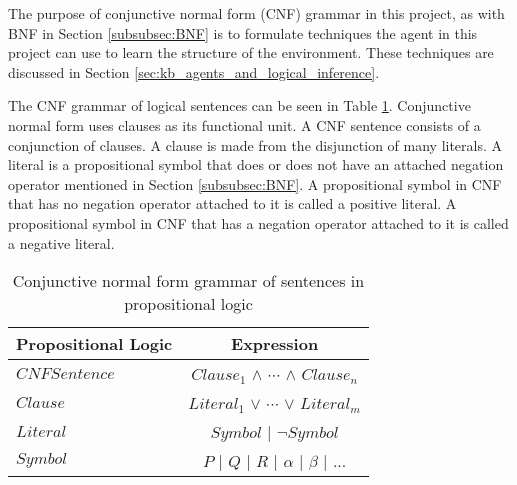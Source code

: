 The purpose of conjunctive normal form (CNF) grammar in this project, as with BNF in Section \ref{subsubsec:BNF} is to formulate techniques the agent in this project can use to learn the structure of the environment. These techniques are  discussed in Section \ref{sec:kb_agents_and_logical_inference}.

The CNF grammar of logical sentences can be seen in Table \ref{table:CNF_Syntax}. Conjunctive normal form uses clauses as its functional unit. A CNF sentence consists of a conjunction of clauses. A clause is made from the disjunction of many literals. A literal is a propositional symbol that does or does not have an attached negation operator mentioned in Section \ref{subsubsec:BNF}. A propositional symbol in CNF that has no negation operator attached to it is called a positive literal. A propositional symbol in CNF that has a negation operator attached to it is called a negative literal.


\begin{table}[H]
  \centering
  \begin{tabular}{lc}
    \toprule
    \textbf{Propositional Logic}  \hspace{1cm}   & \textbf{Expression}  \\
    \toprule
    $CNFSentence$ & $Clause_1$ $\wedge$ $\cdots$  $\wedge$ $Clause_n$ \\ \midrule
    $Clause$ & $Literal_1$  $\vee$ $\cdots$  $\vee$  $Literal_m$   \\ \midrule  
    $Literal$ & $Symbol$ | $\neg Symbol$    \\ \midrule
    $Symbol$ & \textit{$P$} | \textit{$Q$} | \textit{$R$} | \textit{$\alpha$} | \textit{$\beta$} | ...  \\ 
    \bottomrule
  \end{tabular}
  \caption{Conjunctive normal form grammar of sentences in propositional logic}
  \label{table:CNF_Syntax}
\end{table}

\vspace{-0.7 cm}

